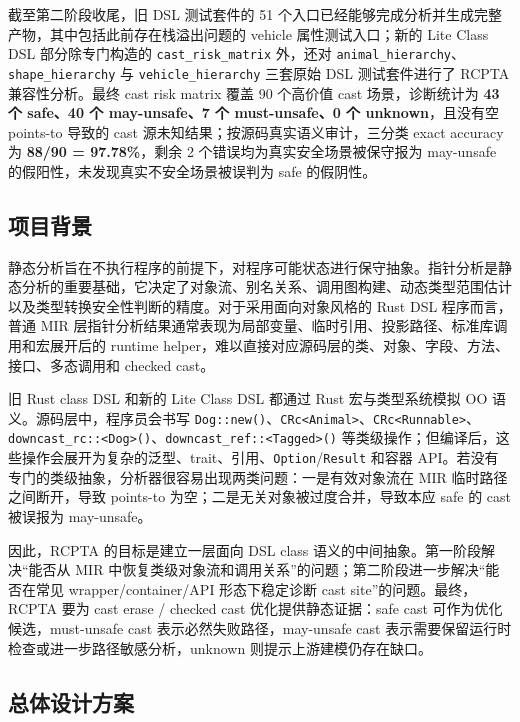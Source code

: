 \documentclass[10.5pt,compsoc,UTF8]{cjc}
\theoremstyle{mystyle}
\begin{document}
截至第二阶段收尾，旧 DSL 测试套件的 51 个入口已经能够完成分析并生成完整产物，其中包括此前存在栈溢出问题的 vehicle 属性测试入口；新的 Lite Class DSL 部分除专门构造的 \texttt{cast\_risk\_matrix} 外，还对 \texttt{animal\_hierarchy}、\texttt{shape\_hierarchy} 与 \texttt{vehicle\_hierarchy} 三套原始 DSL 测试套件进行了 RCPTA 兼容性分析。最终 cast risk matrix 覆盖 90 个高价值 cast 场景，诊断统计为 \textbf{43 个 safe、40 个 may-unsafe、7 个 must-unsafe、0 个 unknown}，且没有空 points-to 导致的 cast 源未知结果；按源码真实语义审计，三分类 exact accuracy 为 \textbf{88/90 = 97.78\%}，剩余 2 个错误均为真实安全场景被保守报为 may-unsafe 的假阳性，未发现真实不安全场景被误判为 safe 的假阴性。

\subsection{项目背景}

静态分析旨在不执行程序的前提下，对程序可能状态进行保守抽象。指针分析是静态分析的重要基础，它决定了对象流、别名关系、调用图构建、动态类型范围估计以及类型转换安全性判断的精度。对于采用面向对象风格的 Rust DSL 程序而言，普通 MIR 层指针分析结果通常表现为局部变量、临时引用、投影路径、标准库调用和宏展开后的 runtime helper，难以直接对应源码层的类、对象、字段、方法、接口、多态调用和 checked cast。

旧 Rust class DSL 和新的 Lite Class DSL 都通过 Rust 宏与类型系统模拟 OO 语义。源码层中，程序员会书写 \texttt{Dog::new()}、\texttt{CRc<Animal>}、\texttt{CRc<Runnable>}、\texttt{downcast\_rc::<Dog>()}、\texttt{downcast\_ref::<Tagged>()} 等类级操作；但编译后，这些操作会展开为复杂的泛型、trait、引用、\texttt{Option}/\texttt{Result} 和容器 API。若没有专门的类级抽象，分析器很容易出现两类问题：一是有效对象流在 MIR 临时路径之间断开，导致 points-to 为空；二是无关对象被过度合并，导致本应 safe 的 cast 被误报为 may-unsafe。

因此，RCPTA 的目标是建立一层面向 DSL class 语义的中间抽象。第一阶段解决“能否从 MIR 中恢复类级对象流和调用关系”的问题；第二阶段进一步解决“能否在常见 wrapper/container/API 形态下稳定诊断 cast site”的问题。最终，RCPTA 要为 cast erase / checked cast 优化提供静态证据：safe cast 可作为优化候选，must-unsafe cast 表示必然失败路径，may-unsafe cast 表示需要保留运行时检查或进一步路径敏感分析，unknown 则提示上游建模仍存在缺口。

\subsection{总体设计方案}
\end{document}
